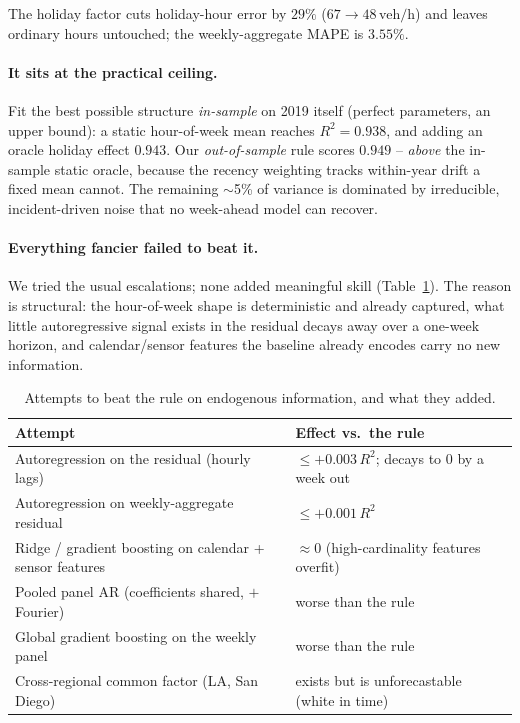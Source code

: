 \documentclass[11pt]{article}
\newcommand{\veh}{\,\text{veh/h}}
\begin{document}
\noindent
The holiday factor cuts holiday-hour error by $29\%$ ($67\!\to\!48\veh$) and leaves
ordinary hours untouched; the weekly-aggregate MAPE is $3.55\%$.

\paragraph{It sits at the practical ceiling.} Fit the best possible structure
\emph{in-sample} on 2019 itself (perfect parameters, an upper bound): a static
hour-of-week mean reaches $R^2 = 0.938$, and adding an oracle holiday effect
$0.943$. Our \emph{out-of-sample} rule scores $0.949$ -- \emph{above} the in-sample
static oracle, because the recency weighting tracks within-year drift a fixed mean
cannot. The remaining $\sim$5\% of variance is dominated by irreducible,
incident-driven noise that no week-ahead model can recover.

\paragraph{Everything fancier failed to beat it.} We tried the usual escalations;
none added meaningful skill (Table~\ref{tab:tried}). The reason is structural: the
hour-of-week shape is deterministic and already captured, what little
autoregressive signal exists in the residual decays away over a one-week horizon,
and calendar/sensor features the baseline already encodes carry no new information.

\begin{table}[H]\centering
\caption{Attempts to beat the rule on endogenous information, and what they added.}
\label{tab:tried}
\begin{tabular}{>{\raggedright\arraybackslash}p{7.2cm}>{\raggedright\arraybackslash}p{7.6cm}}
\toprule
Attempt & Effect vs.\ the rule \\
\midrule
Autoregression on the residual (hourly lags)       & $\le +0.003\,R^2$; decays to $0$ by a week out \\
Autoregression on weekly-aggregate residual        & $\le +0.001\,R^2$ \\
Ridge / gradient boosting on calendar + sensor features & $\approx 0$ (high-cardinality features overfit) \\
Pooled panel AR (coefficients shared, $+$Fourier)  & worse than the rule \\
Global gradient boosting on the weekly panel       & worse than the rule \\
Cross-regional common factor (LA, San Diego)       & exists but is unforecastable (white in time) \\
\bottomrule
\end{tabular}
\end{table}
\end{document}
